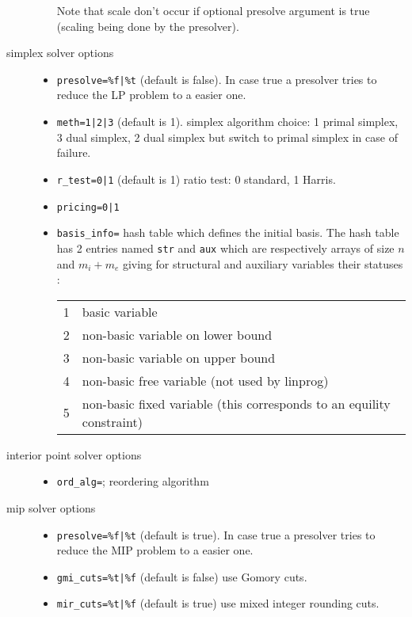 \begin{mandescription}
\begin{description}
\begin{itemize}
\begin{tabular}{|c|l|}
      \end{tabular}
      Note that scale don't occur if optional presolve argument is true (scaling being done by the presolver). 
\end{itemize}
\item[simplex solver options]
\begin{itemize}
\item \verb+presolve=%f|%t+ (default is false). In case true a presolver tries to reduce
      the LP problem to a easier one.
\item \verb+meth=1|2|3+ (default is 1). simplex algorithm choice: 1 primal simplex, 3 dual simplex, 2 
      dual simplex but switch to primal simplex in case of failure.
\item \verb+r_test=0|1+ (default is 1) ratio test: 0 standard, 1 Harris.
\item \verb+pricing=0|1+
\item \verb+basis_info=+  hash table which defines the initial basis. The hash table has 2 entries named
      \verb+str+ and \verb+aux+ which are respectively arrays of size $n$ and $m_i+m_e$ giving for
      structural and auxiliary variables their statuses :
      \begin{tabular}{|c|l|}
        \hline
        1 & basic variable \\
        2 & non-basic variable on lower bound \\
        3 & non-basic variable on upper bound\\
        4 & non-basic free variable (not used by linprog) \\
        5 & non-basic fixed variable (this corresponds to an equility constraint)\\
       \hline
      \end{tabular}
\end{itemize}
\item[interior point solver options]
\begin{itemize}
\item \verb+ord_alg=+; reordering algorithm
\end{itemize}
\item[mip solver options]
\begin{itemize}
\item \verb+presolve=%f|%t+ (default is true). In case true a presolver tries to reduce
      the MIP problem to a easier one.
\item \verb+gmi_cuts=%t|%f+ (default is false) use Gomory cuts.
\item \verb+mir_cuts=%t|%f+ (default is true) use mixed integer rounding cuts.

\end{itemize}
\end{description}
\end{mandescription}
